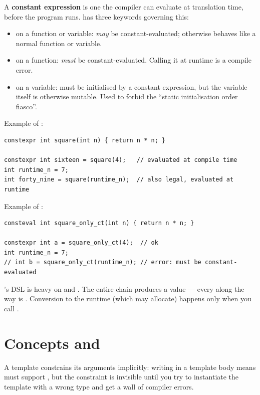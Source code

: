 A \textbf{constant expression} is one the compiler can evaluate at
translation time, before the program runs. \cpp{} has three
keywords governing this:

\begin{itemize}[leftmargin=*]
  \item {} on a function or variable: \emph{may} be
    constant-evaluated; otherwise behaves like a normal function or
    variable.
  \item {} on a function: \emph{must} be
    constant-evaluated. Calling it at runtime is a compile error.
  \item {} on a variable: must be initialised by a
    constant expression, but the variable itself is otherwise
    mutable. Used to forbid the ``static initialisation order
    fiasco''.
\end{itemize}

Example of :

\begin{lstlisting}
constexpr int square(int n) { return n * n; }

constexpr int sixteen = square(4);   // evaluated at compile time
int runtime_n = 7;
int forty_nine = square(runtime_n);  // also legal, evaluated at runtime
\end{lstlisting}

Example of :

\begin{lstlisting}
consteval int square_only_ct(int n) { return n * n; }

constexpr int a = square_only_ct(4);  // ok
int runtime_n = 7;
// int b = square_only_ct(runtime_n); // error: must be constant-evaluated
\end{lstlisting}

\maya{}'s DSL is heavy on  and . The
entire chain  produces a
 value --- every  along the way is
. Conversion to the runtime  (which
may allocate) happens only when you call .

\section{Concepts and }
\label{sec:cpp:concepts}

A template constrains its arguments implicitly: writing 
in a template body means  must support , but
the constraint is invisible until you try to instantiate the
template with a wrong type and get a wall of compiler errors.

